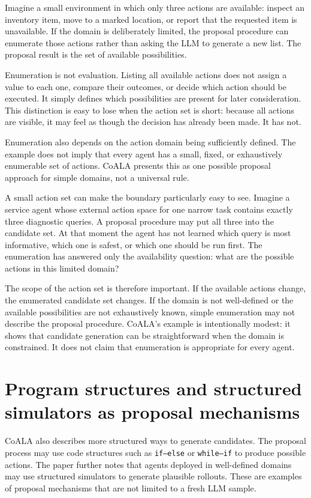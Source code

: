 Imagine a small environment in which only three actions are available: inspect an inventory item, move to a marked location, or report that the requested item is unavailable. If the domain is deliberately limited, the proposal procedure can enumerate those actions rather than asking the LLM to generate a new list. The proposal result is the set of available possibilities.

Enumeration is not evaluation. Listing all available actions does not assign a value to each one, compare their outcomes, or decide which action should be executed. It simply defines which possibilities are present for later consideration. This distinction is easy to lose when the action set is short: because all actions are visible, it may feel as though the decision has already been made. It has not.

Enumeration also depends on the action domain being sufficiently defined. The example does not imply that every agent has a small, fixed, or exhaustively enumerable set of actions. CoALA presents this as one possible proposal approach for simple domains, not a universal rule.


A small action set can make the boundary particularly easy to see. Imagine a service agent whose external action space for one narrow task contains exactly three diagnostic queries. A proposal procedure may put all three into the candidate set. At that moment the agent has not learned which query is most informative, which one is safest, or which one should be run first. The enumeration has answered only the availability question: what are the possible actions in this limited domain?

The scope of the action set is therefore important. If the available actions change, the enumerated candidate set changes. If the domain is not well-defined or the available possibilities are not exhaustively known, simple enumeration may not describe the proposal procedure. CoALA's example is intentionally modest: it shows that candidate generation can be straightforward when the domain is constrained. It does not claim that enumeration is appropriate for every agent.

\section{Program structures and structured simulators as proposal mechanisms}
\label{sec:program-simulator-proposal}

CoALA also describes more structured ways to generate candidates. The proposal process may use code structures such as \texttt{if--else} or \texttt{while--if} to produce possible actions. The paper further notes that agents deployed in well-defined domains may use structured simulators to generate plausible rollouts. These are examples of proposal mechanisms that are not limited to a fresh LLM sample.

